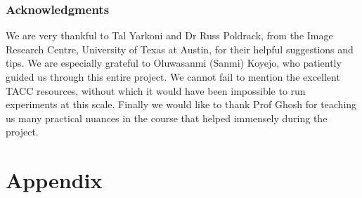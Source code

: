 \documentclass{article} %
\begin{document}
\subsubsection*{Acknowledgments}
We are very thankful to Tal Yarkoni and Dr Russ Poldrack, from the Image Research Centre, University of Texas at Austin, for their
helpful suggestions and tips. We are especially grateful to  Oluwasanmi (Sanmi) Koyejo, who patiently guided us through this entire project.
We cannot fail to mention the excellent TACC resources, without which it would have been impossible to run experiments at this scale.
Finally we would like to thank Prof Ghosh for teaching us many practical nuances in the course that helped immensely during the project.


\nocite{*}


\section{Appendix}
\end{document}
